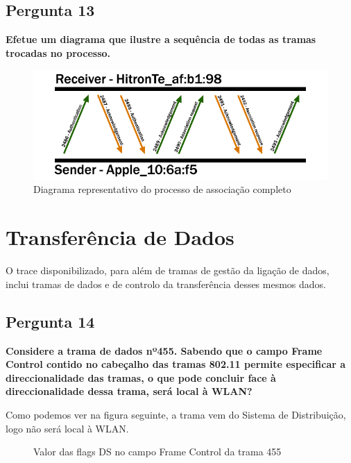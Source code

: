 \documentclass[11pt]{article}
\begin{document}
\subsection{Pergunta 13}

\textbf{Efetue um diagrama que ilustre a sequência de todas as tramas trocadas no processo.}

\begin{figure}[hbt!]
    \centering
    \includegraphics[width=1\textwidth]{images/cap6/diagrama_processo_associacao.png}
    \caption{Diagrama representativo do processo de associação completo}
\end{figure}


\clearpage
\section{Transferência de Dados}

O trace disponibilizado, para além de tramas de gestão da ligação de dados, inclui tramas de dados e de controlo da transferência desses mesmos dados.

\vspace{0.5cm}

\subsection{Pergunta 14}

\textbf{Considere a trama de dados nº455. Sabendo que o campo Frame Control contido no cabeçalho das tramas 802.11 permite especificar a direccionalidade das tramas, o que pode concluir face à direccionalidade dessa trama, será local à WLAN?}

Como podemos ver na figura seguinte, a trama vem do Sistema de Distribuição, logo não será local à WLAN.

\begin{figure}[hbt!]
    \centering
    \caption{Valor das flags DS no campo Frame Control da trama 455}
\end{figure}
\end{document}
